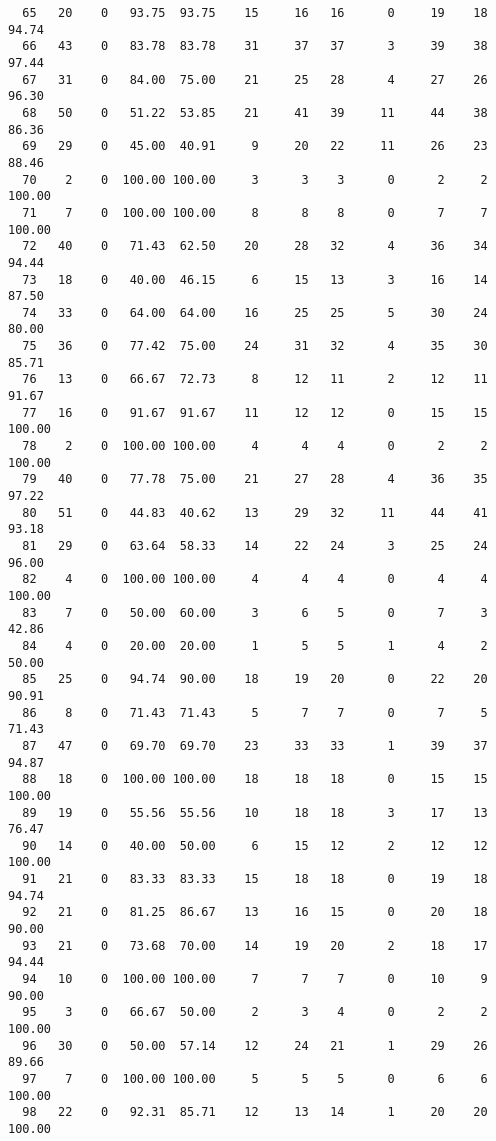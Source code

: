 \begin{verbatim}
  65   20    0   93.75  93.75    15     16   16      0     19    18    94.74
  66   43    0   83.78  83.78    31     37   37      3     39    38    97.44
  67   31    0   84.00  75.00    21     25   28      4     27    26    96.30
  68   50    0   51.22  53.85    21     41   39     11     44    38    86.36
  69   29    0   45.00  40.91     9     20   22     11     26    23    88.46
  70    2    0  100.00 100.00     3      3    3      0      2     2   100.00
  71    7    0  100.00 100.00     8      8    8      0      7     7   100.00
  72   40    0   71.43  62.50    20     28   32      4     36    34    94.44
  73   18    0   40.00  46.15     6     15   13      3     16    14    87.50
  74   33    0   64.00  64.00    16     25   25      5     30    24    80.00
  75   36    0   77.42  75.00    24     31   32      4     35    30    85.71
  76   13    0   66.67  72.73     8     12   11      2     12    11    91.67
  77   16    0   91.67  91.67    11     12   12      0     15    15   100.00
  78    2    0  100.00 100.00     4      4    4      0      2     2   100.00
  79   40    0   77.78  75.00    21     27   28      4     36    35    97.22
  80   51    0   44.83  40.62    13     29   32     11     44    41    93.18
  81   29    0   63.64  58.33    14     22   24      3     25    24    96.00
  82    4    0  100.00 100.00     4      4    4      0      4     4   100.00
  83    7    0   50.00  60.00     3      6    5      0      7     3    42.86
  84    4    0   20.00  20.00     1      5    5      1      4     2    50.00
  85   25    0   94.74  90.00    18     19   20      0     22    20    90.91
  86    8    0   71.43  71.43     5      7    7      0      7     5    71.43
  87   47    0   69.70  69.70    23     33   33      1     39    37    94.87
  88   18    0  100.00 100.00    18     18   18      0     15    15   100.00
  89   19    0   55.56  55.56    10     18   18      3     17    13    76.47
  90   14    0   40.00  50.00     6     15   12      2     12    12   100.00
  91   21    0   83.33  83.33    15     18   18      0     19    18    94.74
  92   21    0   81.25  86.67    13     16   15      0     20    18    90.00
  93   21    0   73.68  70.00    14     19   20      2     18    17    94.44
  94   10    0  100.00 100.00     7      7    7      0     10     9    90.00
  95    3    0   66.67  50.00     2      3    4      0      2     2   100.00
  96   30    0   50.00  57.14    12     24   21      1     29    26    89.66
  97    7    0  100.00 100.00     5      5    5      0      6     6   100.00
  98   22    0   92.31  85.71    12     13   14      1     20    20   100.00

\end{verbatim}
